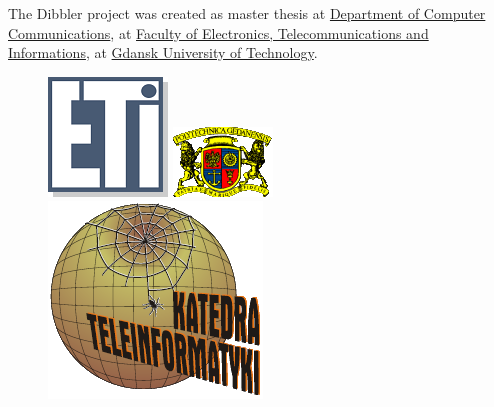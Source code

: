 \noindent
The Dibbler project was created as master thesis at 
\href{http://www.eti.pg.gda.pl/lang?locale=en/}{Department
of Computer Communications}, at \href{http://www.eti.pg.gda.pl/lang?locale=en}{Faculty of Electronics,
Telecommunications and Informations}, at \href{http://www.pg.gda.pl/en/}{Gdansk University of Technology}.

\begin{figure}[ht]
\begin{minipage}[b]{0.33\linewidth}
\centering
\includegraphics[scale=1.0]{logo-eti}
\vspace{-0.8cm}
\end{minipage}
\begin{minipage}[b]{0.33\linewidth}
\centering
\includegraphics[scale=1.1]{logo-pg}
\end{minipage}
\hspace{0.5cm}
\begin{minipage}[b]{0.33\linewidth}
\centering
\includegraphics[scale=0.6]{logo-kti}
\end{minipage}
\end{figure}

\newpage
